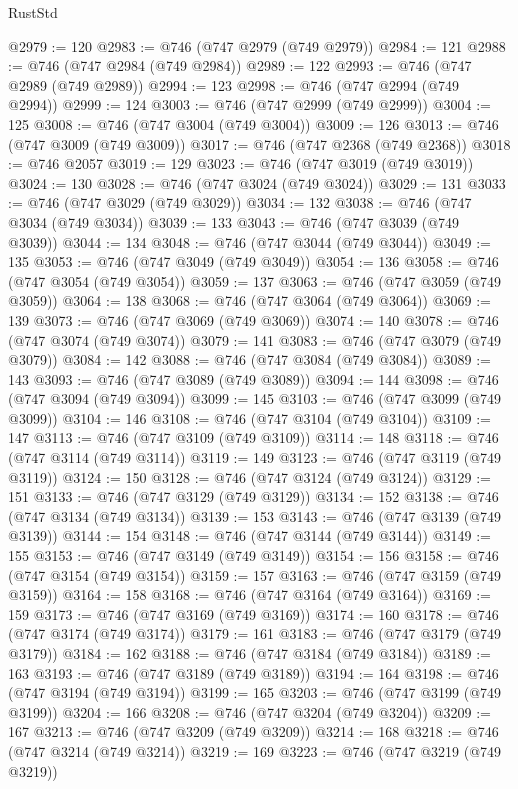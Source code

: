 \begin{lexlean}{RustStd}
\begin{coremodule}
{\begin{coremodule}
{{{{{{{{{{{{{{{{{{{{{{{{{{{{{{{{{{{{{{{{{{{{{{{{{{{{{{{{{{{{{{{{{{{{{{{{{{{{{{{{@2979 := 120
@2983 := @746 (@747 @2979 (@749 @2979))
@2984 := 121
@2988 := @746 (@747 @2984 (@749 @2984))
@2989 := 122
@2993 := @746 (@747 @2989 (@749 @2989))
@2994 := 123
@2998 := @746 (@747 @2994 (@749 @2994))
@2999 := 124
@3003 := @746 (@747 @2999 (@749 @2999))
@3004 := 125
@3008 := @746 (@747 @3004 (@749 @3004))
@3009 := 126
@3013 := @746 (@747 @3009 (@749 @3009))
@3017 := @746 (@747 @2368 (@749 @2368))
@3018 := @746 @2057
@3019 := 129
@3023 := @746 (@747 @3019 (@749 @3019))
@3024 := 130
@3028 := @746 (@747 @3024 (@749 @3024))
@3029 := 131
@3033 := @746 (@747 @3029 (@749 @3029))
@3034 := 132
@3038 := @746 (@747 @3034 (@749 @3034))
@3039 := 133
@3043 := @746 (@747 @3039 (@749 @3039))
@3044 := 134
@3048 := @746 (@747 @3044 (@749 @3044))
@3049 := 135
@3053 := @746 (@747 @3049 (@749 @3049))
@3054 := 136
@3058 := @746 (@747 @3054 (@749 @3054))
@3059 := 137
@3063 := @746 (@747 @3059 (@749 @3059))
@3064 := 138
@3068 := @746 (@747 @3064 (@749 @3064))
@3069 := 139
@3073 := @746 (@747 @3069 (@749 @3069))
@3074 := 140
@3078 := @746 (@747 @3074 (@749 @3074))
@3079 := 141
@3083 := @746 (@747 @3079 (@749 @3079))
@3084 := 142
@3088 := @746 (@747 @3084 (@749 @3084))
@3089 := 143
@3093 := @746 (@747 @3089 (@749 @3089))
@3094 := 144
@3098 := @746 (@747 @3094 (@749 @3094))
@3099 := 145
@3103 := @746 (@747 @3099 (@749 @3099))
@3104 := 146
@3108 := @746 (@747 @3104 (@749 @3104))
@3109 := 147
@3113 := @746 (@747 @3109 (@749 @3109))
@3114 := 148
@3118 := @746 (@747 @3114 (@749 @3114))
@3119 := 149
@3123 := @746 (@747 @3119 (@749 @3119))
@3124 := 150
@3128 := @746 (@747 @3124 (@749 @3124))
@3129 := 151
@3133 := @746 (@747 @3129 (@749 @3129))
@3134 := 152
@3138 := @746 (@747 @3134 (@749 @3134))
@3139 := 153
@3143 := @746 (@747 @3139 (@749 @3139))
@3144 := 154
@3148 := @746 (@747 @3144 (@749 @3144))
@3149 := 155
@3153 := @746 (@747 @3149 (@749 @3149))
@3154 := 156
@3158 := @746 (@747 @3154 (@749 @3154))
@3159 := 157
@3163 := @746 (@747 @3159 (@749 @3159))
@3164 := 158
@3168 := @746 (@747 @3164 (@749 @3164))
@3169 := 159
@3173 := @746 (@747 @3169 (@749 @3169))
@3174 := 160
@3178 := @746 (@747 @3174 (@749 @3174))
@3179 := 161
@3183 := @746 (@747 @3179 (@749 @3179))
@3184 := 162
@3188 := @746 (@747 @3184 (@749 @3184))
@3189 := 163
@3193 := @746 (@747 @3189 (@749 @3189))
@3194 := 164
@3198 := @746 (@747 @3194 (@749 @3194))
@3199 := 165
@3203 := @746 (@747 @3199 (@749 @3199))
@3204 := 166
@3208 := @746 (@747 @3204 (@749 @3204))
@3209 := 167
@3213 := @746 (@747 @3209 (@749 @3209))
@3214 := 168
@3218 := @746 (@747 @3214 (@749 @3214))
@3219 := 169
@3223 := @746 (@747 @3219 (@749 @3219))
}}}}}}}}}}}}}}}}}}}}}}}}}}}}}}}}}}}}}}}}}}}}}}}}}}}}}}}}}}}}}}}}}}}}}}}}}}}}}}}}
\end{coremodule}}
\end{coremodule}
\end{lexlean}
